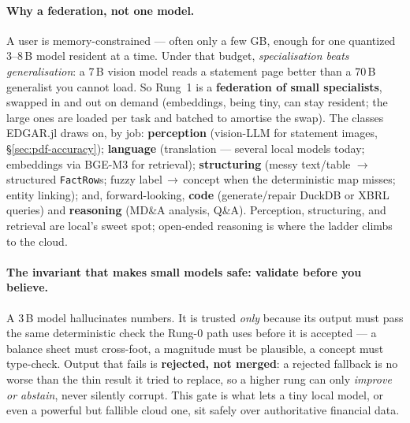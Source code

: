 \documentclass[11pt,a4paper]{report}
\begin{document}
\paragraph{Why a federation, not one model.} A user is memory-constrained --- often only a few GB, enough for
one quantized 3--8\,B model resident at a time. Under that budget, \emph{specialisation beats generalisation}:
a 7\,B vision model reads a statement page better than a 70\,B generalist you cannot load. So Rung~1 is a
\textbf{federation of small specialists}, swapped in and out on demand (embeddings, being tiny, can stay
resident; the large ones are loaded per task and batched to amortise the swap). The classes EDGAR.jl draws on,
by job: \textbf{perception} (vision-LLM for statement images, \S\ref{sec:pdf-accuracy}); \textbf{language}
(translation --- several local models today; embeddings via BGE-M3 for retrieval); \textbf{structuring}
(messy text/table $\to$ structured \texttt{FactRow}s; fuzzy label\,$\to$\,concept when the deterministic map
misses; entity linking); and, forward-looking, \textbf{code} (generate/repair DuckDB or XBRL queries) and
\textbf{reasoning} (\textsc{MD\&A} analysis, Q\&A). Perception, structuring, and retrieval are local's sweet
spot; open-ended reasoning is where the ladder climbs to the cloud.

\paragraph{The invariant that makes small models safe: validate before you believe.} A 3\,B model
hallucinates numbers. It is trusted \emph{only} because its output must pass the same deterministic check the
Rung-0 path uses before it is accepted --- a balance sheet must cross-foot, a magnitude must be plausible, a
concept must type-check. Output that fails is \textbf{rejected, not merged}: a rejected fallback is no worse
than the thin result it tried to replace, so a higher rung can only \emph{improve or abstain}, never silently
corrupt. This gate is what lets a tiny local model, or even a powerful but fallible cloud one, sit safely over
authoritative financial data.
\end{document}
